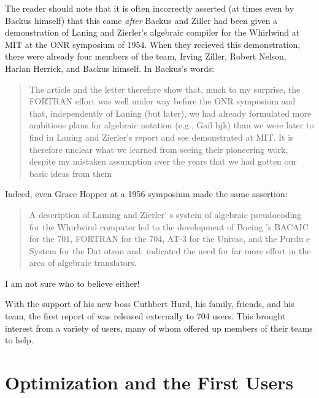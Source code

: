 The reader should note that it is often incorrectly asserted
(at times even by Backus himself\cite{Backus_1980_Programming_in_America_in_1950s})
that this came \textit{after} Backus and Ziller had been given a demonstration
of Laning and Zierler's algebraic compiler for the Whirlwind at MIT at the ONR symposium of 1954.
When they recieved this demonstration, there were already four members of the \FTN{} team,
Irving Ziller, Robert Nelson, Harlan Herrick, and Backus himself.
In Backus's words\cite{Backus_1980_Programming_in_America_in_1950s}:

\begin{quotation}
The article and the letter therefore show that, much to my surprise, the 
FORTRAN effort was well under way before the ONR symposium and that, 
independently of Laning (but later), we had already formulated more ambitious 
plans for algebraic notation (e.g., Gail bjk) than we were later to find in 
Laning and Zierler's report and see demonstrated at MIT. It is therefore 
unclear what we learned from seeing their pioneering work, despite my mistaken 
assumption over the years that we had gotten our basic ideas from them
\end{quotation}

Indeed, even Grace Hopper at a 1956 symposium made the same assertion:

\begin{quotation}
    A description of Laming and Zierler' s system of algebraic pseudocoding for 
the Whirlwind computer led to the development of Boeing 's BACAIC for the 701, 
FORTRAN for the 704, AT-3 for the Univac, and the Purdu e System for the Dat 
otron and. indicated the need for far more effort in the area of algebraic 
translators.
\cite{Knuth_TrabbPardo_1976_Early_Development}
\end{quotation}

I am not sure who to believe either!

With the support of his new boss Cuthbert Hurd, his family, friends, and his team,
the first report of \FTN{} was released externally to 704 users.
This brought interest from a variety of users, many of whom offered up members
of their teams to help.

\section{\FTN{} Optimization and the First Users}

